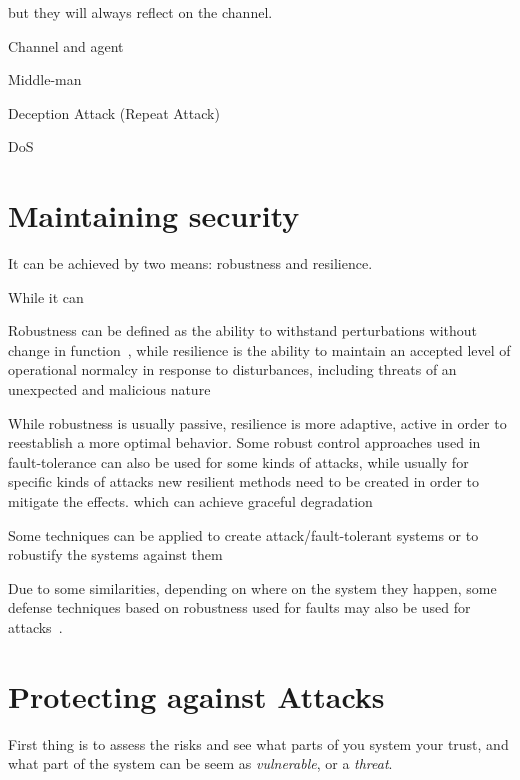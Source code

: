\documentclass[../main.tex]{subfiles}
\begin{document}
but they will always reflect on the channel.


Channel and agent

Middle-man

Deception Attack (Repeat Attack)

DoS

\cite{GuEtAl2016}

\section{Maintaining security}\label{sec:maintaining_security}
It can be achieved by two means: robustness and resilience.

While it can

Robustness can be defined as the ability to withstand perturbations without change in function~\cite{Jen2003}, while resilience
  is the ability to maintain an accepted level of operational normalcy  in  response  to  disturbances,  including  threats  of  an unexpected and malicious nature\cite{Rieger2010}

While robustness is usually passive, resilience is more adaptive, active in order to reestablish a more optimal behavior.
Some robust control approaches used in fault-tolerance can also be used for some kinds of attacks, while usually for specific kinds of attacks new resilient methods need to be created in order to mitigate the effects.
which can achieve graceful degradation


Some techniques can be applied to create attack/fault-tolerant systems or to robustify the systems against them\cite{DingEtAl2018,SatchidanandanKumar2017}

Due to some similarities, depending on where on the system they happen, some defense techniques based on robustness used for faults may also be used for attacks~\cite{TeixeiraEtAl2015}.



\section{Protecting against Attacks}\label{sec:protecting_against_attacks}
First thing is to assess the risks and see what parts of you system your trust, and what part of the system can be seem as \emph{vulnerable}, or a \emph{threat}.
\end{document}
